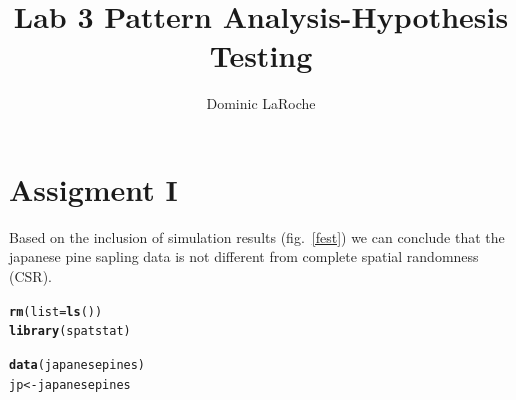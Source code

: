 \documentclass{article}\usepackage[]{graphicx}\usepackage[]{color}
\title{Lab 3 Pattern Analysis-Hypothesis Testing}
\author{Dominic LaRoche}
\makeatletter
\newcommand{\hlstd}[1]{\textcolor[rgb]{0.345,0.345,0.345}{#1}}%
\newcommand{\hlkwb}[1]{\textcolor[rgb]{0.69,0.353,0.396}{#1}}%
\newcommand{\hlkwc}[1]{\textcolor[rgb]{0.333,0.667,0.333}{#1}}%
\newcommand{\hlkwd}[1]{\textcolor[rgb]{0.737,0.353,0.396}{\textbf{#1}}}%
\newenvironment{kframe}{%
 \def\at@end@of@kframe{}%
 \ifinner\ifhmode%
  \def\at@end@of@kframe{\end{minipage}}%
  \begin{minipage}{\columnwidth}%
 \fi\fi%
 \def\FrameCommand##1{\hskip\@totalleftmargin \hskip-\fboxsep
 \colorbox{shadecolor}{##1}\hskip-\fboxsep
     \hskip-\linewidth \hskip-\@totalleftmargin \hskip\columnwidth}%
 \MakeFramed {\advance\hsize-\width
   \@totalleftmargin\z@ \linewidth\hsize
   \@setminipage}}%
 {\par\unskip\endMakeFramed%
 \at@end@of@kframe}
\newenvironment{knitrout}{}{} %
\makeatother
\begin{document}
\maketitle

\section{Assigment I}
Based on the inclusion of simulation results (fig.~\ref{fest}) we can conclude that the japanese pine sapling data is not different from complete spatial randomness (CSR).
\begin{knitrout}
\color{fgcolor}\begin{kframe}
\begin{alltt}
\hlkwd{rm}\hlstd{(}\hlkwc{list}\hlstd{=}\hlkwd{ls}\hlstd{())}
\hlkwd{library}\hlstd{(spatstat)}
\end{alltt}


{\ttfamily\noindent\itshape\color{messagecolor}{\#\# \\\#\# spatstat 1.38-1\ \ \ \ \ \  (nickname: 'Le Hardi') \\\#\# For an introduction to spatstat, type 'beginner'}}\begin{alltt}
\hlkwd{data}\hlstd{(japanesepines)}
\hlstd{jp}\hlkwb{<-}\hlstd{japanesepines}
\end{alltt}
\end{kframe}
\end{knitrout}
\end{document}
